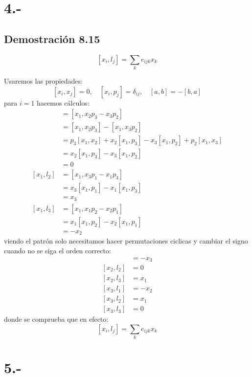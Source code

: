 \documentclass{article}
\begin{document}
\section*{4.-}
\subsection*{Demostración 8.15}
\[ [x_i,l_j] = \sum_{k}e_{ijk}x_k \]
\begin{tcolorbox}[breakable]
    Usaremos las propiedades:
    \[ [x_i,x_j] = 0, \quad [x_i,p_j] = \delta_{ij}, \quad [a,b] = -[b,a] \]
    para $i=1$ hacemos cálculos:
    \begin{align*}
        [x_1,l_1]
        &= [x_1, x_2p_3-x_3p_2] \\
        &= [x_1,x_2p_3] - [x_1,x_3p_2] \\
        &= p_3[x_1,x_2] + x_2[x_1,p_3] - x_3[x_1,p_2] + p_2[x_1,x_3] \\
        &= x_2[x_1,p_3] - x_3[x_1,p_2] \\ 
        &= 0 \\
        [x_1,l_2]
        &= [x_1,x_3p_1-x_1p_3] \\
        &= x_3[x_1,p_1] - x_1[x_1,p_3] \\
        &= x_3 \\
        [x_1,l_3] 
        &= [x_1, x_1p_2-x_2p_1] \\
        &= x_1[x_1,p_2]-x_2[x_1,p_1] \\
        &= -x_2
    \end{align*}
    viendo el patrón solo necesitamos hacer permutaciones ciclicas y cambiar el signo cuando no se siga el orden correcto:
    \begin{align*}
        [x_2,l_1]
        &= -x_3 \\
        [x_2,l_2] 
        &= 0 \\
        [x_2,l_3]
        &= x_1 \\
        [x_3,l_1] 
        &= -x_2 \\
        [x_3,l_2]
        &= x_1 \\
        [x_3,l_3]
        &= 0
    \end{align*}
    donde se comprueba que en efecto:
    \[ [x_i,l_j] = \sum_{k}e_{ijk}x_k \]
\end{tcolorbox}

\section*{5.-}
\end{document}
